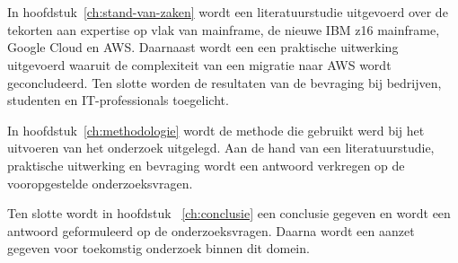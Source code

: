 \section{}
\label{sec:opzet-bachelorproef}


In hoofdstuk~\ref{ch:stand-van-zaken} wordt een literatuurstudie uitgevoerd over de tekorten aan expertise op vlak van mainframe, de nieuwe IBM z16 mainframe, Google Cloud en AWS. Daarnaast wordt een een praktische uitwerking uitgevoerd waaruit de complexiteit van een migratie naar AWS wordt geconcludeerd. Ten slotte worden de resultaten van de bevraging bij bedrijven, studenten en IT-professionals toegelicht.

In hoofdstuk~\ref{ch:methodologie} wordt de methode die  gebruikt werd bij het uitvoeren van het onderzoek uitgelegd. Aan de hand van een literatuurstudie, praktische uitwerking en bevraging wordt een antwoord verkregen op de vooropgestelde onderzoeksvragen.

Ten slotte wordt in hoofdstuk ~\ref{ch:conclusie} een conclusie gegeven en wordt een antwoord geformuleerd op de onderzoeksvragen. Daarna wordt een aanzet gegeven voor toekomstig onderzoek binnen dit domein.
